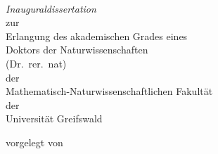 \begin{titlepage}
    \begin{center}
        \huge\textbf{}\\
        \vspace{0.8cm}
        {\huge\itshape Inauguraldissertation}\\
        \vspace{0.8cm}
        {\Large zur\\
        \vspace{0.25cm}
        Erlangung des akademischen Grades eines\\
        Doktors der Naturwissenschaften\\
        (Dr.\ rer.\ nat)\\
        \vspace{0.25cm}
        der\\
        \vspace{0.25cm}
        Mathematisch-Naturwissenschaftlichen Fakultät\\
        \vspace{0.25cm}
        der\\
        \vspace{0.25cm}
        Universität Greifswald\\
        }
        \vspace{1cm}
    \end{center}
    \vspace*{\fill}%

    \begin{minipage}[]{0.6\linewidth}
        \hfill\vspace{0.1cm}
    \end{minipage}
    \begin{minipage}[]{0.375\linewidth}
        \begin{flushleft}
            vorgelegt von \\
            \\%
        \end{flushleft}
    \end{minipage}
    \vspace{0.5cm}%


\end{titlepage}
